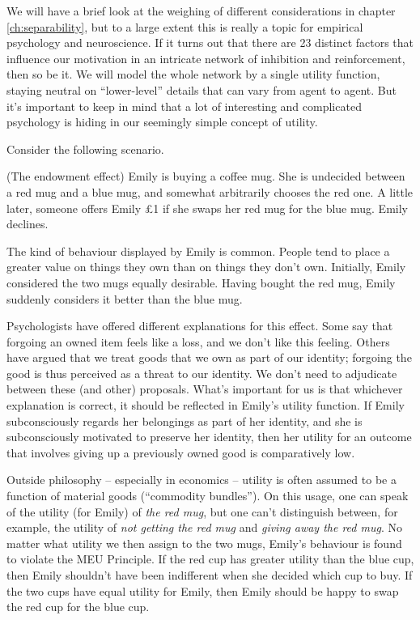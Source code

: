 We will have a brief look at the weighing of different considerations in chapter
\ref{ch:separability}, but to a large extent this is really a topic for
empirical psychology and neuroscience. If it turns out that there are 23
distinct factors that influence our motivation in an intricate network of
inhibition and reinforcement, then so be it. We will model the whole network by
a single utility function, staying neutral on ``lower-level'' details that can
vary from agent to agent. But it's important to keep in mind that a lot of
interesting and complicated psychology is hiding in our seemingly simple concept
of utility.

Consider the following scenario.
%
\begin{example}(The endowment effect)
  Emily is buying a coffee mug. She is undecided between a red mug and a blue
  mug, and somewhat arbitrarily chooses the red one. A little later, someone
  offers Emily £1 if she swaps her red mug for the blue mug. Emily declines.
\end{example}

The kind of behaviour displayed by Emily is common. People tend to place a
greater value on things they own than on things they don't own. Initially, Emily
considered the two mugs equally desirable. Having bought the red mug, Emily
suddenly considers it better than the blue mug.

Psychologists have offered different explanations for this effect. Some say that
forgoing an owned item feels like a loss, and we don't like this feeling. Others
have argued that we treat goods that we own as part of our identity; forgoing
the good is thus perceived as a threat to our identity. We don't need to
adjudicate between these (and other) proposals. What's important for us is that
whichever explanation is correct, it should be reflected in Emily's utility
function. If Emily subconsciously regards her belongings as part of her
identity, and she is subconsciously motivated to preserve her identity, then her
utility for an outcome that involves giving up a previously owned good is
comparatively low.

Outside philosophy -- especially in economics -- utility is often assumed to be
a function of material goods (``commodity bundles''). On this usage, one can
speak of the utility (for Emily) of \emph{the red mug}, but one can't
distinguish between, for example, the utility of \emph{not getting the red mug}
and \emph{giving away the red mug}. No matter what utility we then assign to the
two mugs, Emily's behaviour is found to violate the MEU Principle. If the red
cup has greater utility than the blue cup, then Emily shouldn't have been
indifferent when she decided which cup to buy. If the two cups have equal
utility for Emily, then Emily should be happy to swap the red cup for the blue
cup.

